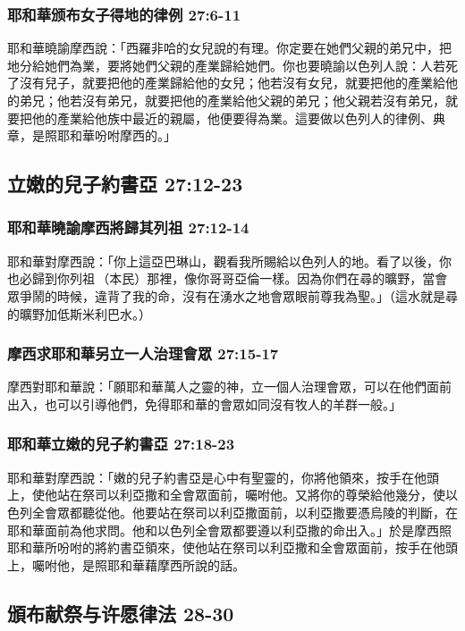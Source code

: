 \subsubsection{耶和華颁布女子得地的律例  27:6-11}
耶和華曉諭摩西說：「西羅非哈的女兒說的有理。你定要在她們父親的弟兄中，把地分給她們為業，要將她們父親的產業歸給她們。你也要曉諭以色列人說：人若死了沒有兒子，就要把他的產業歸給他的女兒；他若沒有女兒，就要把他的產業給他的弟兄；他若沒有弟兄，就要把他的產業給他父親的弟兄；他父親若沒有弟兄，就要把他的產業給他族中最近的親屬，他便要得為業。這要做以色列人的律例、典章，是照耶和華吩咐摩西的。」

\subsection{立嫩的兒子約書亞  27:12-23}
\subsubsection{耶和華曉諭摩西將歸其列祖  27:12-14}
耶和華對摩西說：「你上這亞巴琳山，觀看我所賜給以色列人的地。看了以後，你也必歸到你列祖 （本民）那裡，像你哥哥亞倫一樣。因為你們在尋的曠野，當會眾爭鬧的時候，違背了我的命，沒有在湧水之地會眾眼前尊我為聖。」（這水就是尋的曠野加低斯米利巴水。）

\subsubsection{摩西求耶和華另立一人治理會眾 27:15-17}
摩西對耶和華說：「願耶和華萬人之靈的神，立一個人治理會眾，可以在他們面前出入，也可以引導他們，免得耶和華的會眾如同沒有牧人的羊群一般。」 

\subsubsection{耶和華立嫩的兒子約書亞 27:18-23}
耶和華對摩西說：「嫩的兒子約書亞是心中有聖靈的，你將他領來，按手在他頭上，使他站在祭司以利亞撒和全會眾面前，囑咐他。又將你的尊榮給他幾分，使以色列全會眾都聽從他。他要站在祭司以利亞撒面前，以利亞撒要憑烏陵的判斷，在耶和華面前為他求問。他和以色列全會眾都要遵以利亞撒的命出入。」於是摩西照耶和華所吩咐的將約書亞領來，使他站在祭司以利亞撒和全會眾面前，按手在他頭上，囑咐他，是照耶和華藉摩西所說的話。

\subsection{頒布献祭与许愿律法 28-30 }
